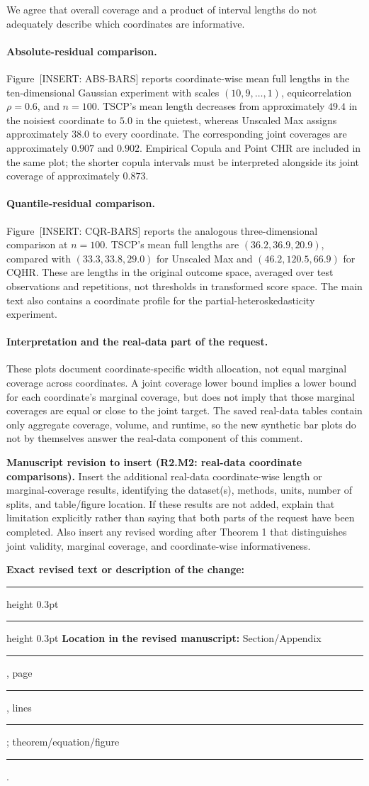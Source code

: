 \documentclass[11pt]{article}
\numberwithin{equation}{section}
\newcommand{\pending}[1]{\textcolor{AuthorRed}{[INSERT: #1]}}
\newcommand{\revisionblock}[2]{%
  \par\begingroup\color{AuthorRed}\small
  \textbf{Manuscript revision to insert (#1).} #2\par
  \textbf{Exact revised text or description of the change:}\par
  \vspace{0.35em}\hrule height 0.3pt\vspace{1.4em}
  \hrule height 0.3pt\vspace{0.6em}
  \textbf{Location in the revised manuscript:}
  Section/Appendix \rule{1.3cm}{0.3pt},
  page \rule{1cm}{0.3pt},
  lines \rule{1.3cm}{0.3pt};
  theorem/equation/figure \rule{1.4cm}{0.3pt}.
  \par\endgroup}
\newcommand{\FigAbsoluteBars}{Figure~\pending{ABS-BARS}} %
\newcommand{\FigCQBars}{Figure~\pending{CQR-BARS}} %
\begin{document}
We agree that overall coverage and a product of interval lengths do
not adequately describe which coordinates are informative.

\paragraph{Absolute-residual comparison.}
\FigAbsoluteBars{} reports coordinate-wise mean full lengths in the
ten-dimensional Gaussian experiment with scales $(10,9,\ldots,1)$,
equicorrelation $\rho=0.6$, and $n=100$. TSCP's mean length decreases
from approximately $49.4$ in the noisiest coordinate to $5.0$ in the
quietest, whereas Unscaled Max assigns approximately $38.0$ to every
coordinate. The corresponding joint coverages are approximately
$0.907$ and $0.902$. Empirical Copula and Point CHR are included in
the same plot; the shorter copula intervals must be interpreted
alongside its joint coverage of approximately $0.873$.

\paragraph{Quantile-residual comparison.}
\FigCQBars{} reports the analogous three-dimensional comparison at
$n=100$. TSCP's mean full lengths are $(36.2,36.9,20.9)$, compared
with $(33.3,33.8,29.0)$ for Unscaled Max and $(46.2,120.5,66.9)$
for CQHR. These are lengths in the original outcome space, averaged
over test observations and repetitions, not thresholds in transformed
score space. The main text also contains a coordinate profile for
the partial-heteroskedasticity experiment.

\paragraph{Interpretation and the real-data part of the request.}
These plots document coordinate-specific width allocation, not equal
marginal coverage across coordinates. A joint coverage lower bound
implies a lower bound for each coordinate's marginal coverage, but
does not imply that those marginal coverages are equal or close to
the joint target. The saved real-data tables contain only aggregate
coverage, volume, and runtime, so the new synthetic bar plots do not
by themselves answer the real-data component of this comment.

\revisionblock{R2.M2: real-data coordinate comparisons}{Insert the
additional real-data coordinate-wise length or marginal-coverage
results, identifying the dataset(s), methods, units, number of splits,
and table/figure location. If these results are not added, explain
that limitation explicitly rather than saying that both parts of
the request have been completed. Also insert any revised wording
after Theorem 1 that distinguishes joint validity, marginal coverage,
and coordinate-wise informativeness.}
\end{document}
